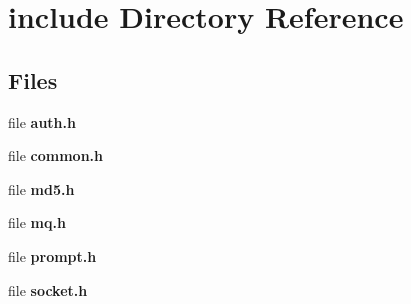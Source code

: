 \section{include Directory Reference}
\label{dir_d44c64559bbebec7f509842c48db8b23}
\subsection*{Files}
\begin{DoxyCompactItemize}
\item 
file \textbf{ auth.\+h}
\item 
file \textbf{ common.\+h}
\item 
file \textbf{ md5.\+h}
\item 
file \textbf{ mq.\+h}
\item 
file \textbf{ prompt.\+h}
\item 
file \textbf{ socket.\+h}
\end{DoxyCompactItemize}
